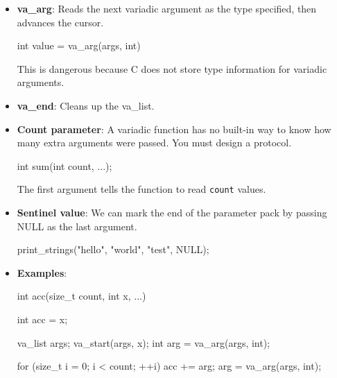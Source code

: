 \documentclass{report}
\begin{document}
\begin{itemize}
\begin{cppcode}
{                        // args points to first argument after x
                        va_start(args, x); 
                    }
                \end{cppcode}
                \bigbreak \noindent 
                The second argument must be the last named parameter before ....
            \item \textbf{va\_arg}: Reads the next variadic argument as the type specified, then advances the cursor.
                \bigbreak \noindent 
                \begin{cppcode}
                    int value = va_arg(args, int)
                \end{cppcode}
                \bigbreak \noindent 
                This is dangerous because C does not store type information for variadic arguments.
            \item \textbf{va\_end}: Cleans up the va\_list.
            \item \textbf{Count parameter}: A variadic function has no built-in way to know how many extra arguments were passed. You must design a protocol.
                \bigbreak \noindent 
                \begin{cppcode}
                int sum(int count, ...);
                \end{cppcode}
                \bigbreak \noindent 
                The first argument tells the function to read \texttt{count} values.
            \item \textbf{Sentinel value}: We can mark the end of the parameter pack by passing NULL as the last argument.
                \bigbreak \noindent 
                \begin{cppcode}
                print_strings("hello", "world", "test", NULL);
                \end{cppcode}
            \item \textbf{Examples}: 
                \bigbreak \noindent 
                \begin{cppcode}
                    int acc(size_t count, int x, ...) {
                        int acc = x;

                        va_list args;
                        va_start(args, x); 
                        int arg = va_arg(args, int);

                        for (size_t i = 0; i < count; ++i) {
                            acc += arg; 
                            arg = va_arg(args, int);
                        }

}
\end{cppcode}
\end{itemize}
\end{document}
